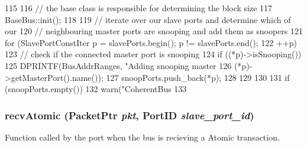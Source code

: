 \begin{DoxyCode}
115 {
116     // the base class is responsible for determining the block size
117     BaseBus::init();
118 
119     // iterate over our slave ports and determine which of our
120     // neighbouring master ports are snooping and add them as snoopers
121     for (SlavePortConstIter p = slavePorts.begin(); p != slavePorts.end();
122          ++p) {
123         // check if the connected master port is snooping
124         if ((*p)->isSnooping()) {
125             DPRINTF(BusAddrRanges, "Adding snooping master %
126                     (*p)->getMasterPort().name());
127             snoopPorts.push_back(*p);
128         }
129     }
130 
131     if (snoopPorts.empty())
132         warn("CoherentBus %
133 }
\end{DoxyCode}
\hypertarget{classCoherentBus_ab0e34155d341f5561834eca8e4c97759}{
\subsubsection[{recvAtomic}]{ recvAtomic ({\bf PacketPtr} {\em pkt}, \/  {\bf PortID} {\em slave\_\-port\_\-id})}}
\label{classCoherentBus_ab0e34155d341f5561834eca8e4c97759}
Function called by the port when the bus is recieving a Atomic transaction. 


